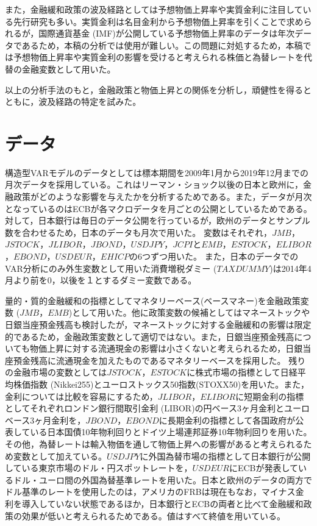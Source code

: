 \documentclass[12pt]{jarticle}
\begin{document}
{また，金融緩和政策の波及経路としては予想物価上昇率や実質金利に注目している先行研究も多い。実質金利は名目金利から予想物価上昇率を引くことで求められるが，国際通貨基金 (IMF)が公開している予想物価上昇率のデータは年次データであるため，本稿の分析では使用が難しい。この問題に対処するため，本稿では予想物価上昇率や実質金利の影響を受けると考えられる株価と為替レートを代替の金融変数として用いた。

以上の分析手法のもと，金融政策と物価上昇との関係を分析し，頑健性を得るとともに，波及経路の特定を試みた。

\newpage

\section{データ}

構造型VARモデルのデータとしては標本期間を2009年1月から2019年12月までの月次データを採用している。これはリーマン・ショック以後の日本と欧州に，金融政策がどのような影響を与えたかを分析するためである。また，データが月次となっているのはECBが各マクロデータを月ごとの公開としているためである。対して，日本銀行は毎日のデータ公開を行っているが，欧州のデータとサンプル数を合わせるため，日本のデータも月次で用いた。
変数はそれぞれ，$JMB$，$JSTOCK$，$JLIBOR$，$JBOND$，$USDJPY$，$JCPI$と$EMB$，$ESTOCK$，$ELIBOR$，$EBOND$，$USDEUR$，$EHICP$の6つずつ用いた。
また，日本のデータでのVAR分析にのみ外生変数として用いた消費増税ダミー ($TAXDUMMY$)は2014年4月より前を0，以後を１とするダミー変数である。

量的・質的金融緩和の指標としてマネタリーベース(ベースマネー)を金融政策変数 ($JMB，EMB$)として用いた。他に政策変数の候補としてはマネーストックや日銀当座預金残高も検討したが，マネーストックに対する金融緩和の影響は限定的であるため，金融政策変数として適切ではない。また，日銀当座預金残高についても物価上昇に対する流通現金の影響は小さくないと考えられるため，日銀当座預金残高に流通現金を加えたものであるマネタリーベースを採用した。
残りの金融市場の変数としては$JSTOCK，ESTOCK$に株式市場の指標として日経平均株価指数 (Nikkei255)とユーロストックス50指数(STOXX50)を用いた。また，金利については比較を容易にするため，$JLIBOR，ELIBOR$に短期金利の指標としてそれぞれロンドン銀行間取引金利 (LIBOR)の円ベース3ヶ月金利とユーロベース3ヶ月金利を，$JBOND，EBOND$に長期金利の指標として各国政府が公表している日本国債10年物利回りとドイツ上場連邦証券10年物利回りを用いた。その他，為替レートは輸入物価を通して物価上昇への影響があると考えられるため変数として加えている。$USDJPY$に外国為替市場の指標として日本銀行が公開している東京市場のドル・円スポットレートを，$USDEUR$にECBが発表しているドル・ユーロ間の外国為替基準レートを用いた。日本と欧州のデータの両方でドル基準のレートを使用したのは，アメリカのFRBは現在もなお，マイナス金利を導入していない状態であるほか，日本銀行とECBの両者と比べて金融緩和政策の効果が低いと考えられるためである。値はすべて終値を用いている。

}
\end{document}
